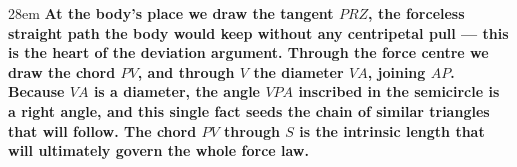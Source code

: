 \documentclass[border=4pt]{standalone}
\begin{document}
\begin{varwidth}{28em}
\large\bfseries
At the body's place we draw the \textcolor{tanteal}{tangent $PRZ$}, the forceless straight path the body would keep      without any centripetal pull — this is the heart of the deviation argument.      Through the force centre we draw the \textcolor{diampurple}{chord $PV$}, and through $V$ the \textcolor{diampurple}{diameter $VA$}, joining $AP$.      Because $VA$ is a diameter, the angle $VPA$ inscribed in the semicircle is a right angle,      and this single fact seeds the chain of similar triangles that will follow.      The \textcolor{diampurple}{chord $PV$ through $S$} is the intrinsic length that will ultimately govern the whole force law.
\end{varwidth}
\end{document}
